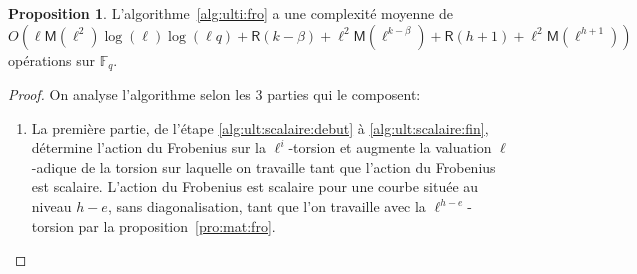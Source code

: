 \documentclass[10pt,a4paper]{book}
\theoremstyle{plain}
\theoremstyle{definition}
\theoremstyle{definition}
\theoremstyle{definition}
\newtheorem{prop}[thm]{Proposition}
\theoremstyle{definition}
\theoremstyle{remark}
\theoremstyle{remark}
\theoremstyle{definition}
\begin{document}
\begin{prop}
\label{pro:alg:ulti}
L'algorithme~\ref{alg:ulti:fro} a une complexité moyenne de
\[O(\ell\mathsf{M}(\ell^2)\log(\ell)\log(\ell q)+\mathsf{R}(k-\beta) + \ell^2
\mathsf{M}(\ell^{k-\beta})+\mathsf{R}(h+1)+\ell^2 \mathsf{M}(\ell^{h+1}))\] 
opérations sur $\mathbb{F}_q$.
\end{prop}
\begin{proof}
On analyse l'algorithme selon les 3 parties qui le composent: 
\begin{enumerate}
\item La première partie, de l'étape \ref{alg:ult:scalaire:debut} à 
\ref{alg:ult:scalaire:fin}, détermine l'action du Frobenius sur la $\ell^i$-torsion 
et augmente la valuation $\ell$-adique de la torsion sur laquelle on travaille 
tant que l'action du Frobenius est scalaire. L'action du Frobenius est scalaire 
pour une courbe située au niveau $h-e$, sans diagonalisation, tant que l'on 
travaille avec la $\ell^{h-e}$-torsion par la proposition~\ref{pro:mat:fro}.


\end{enumerate}
\end{proof}
\end{document}

